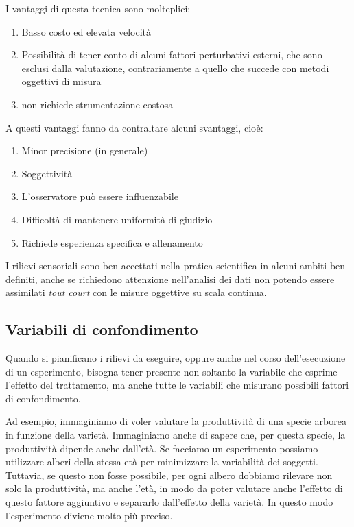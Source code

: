 \documentclass[
  12pt,
]{book}
\providecommand{\tightlist}{%
  \setlength{\itemsep}{0pt}\setlength{\parskip}{0pt}}
\begin{document}
I vantaggi di questa tecnica sono molteplici:

\begin{enumerate}
\def\labelenumi{\arabic{enumi}.}
\tightlist
\item
  Basso costo ed elevata velocità
\item
  Possibilità di tener conto di alcuni fattori perturbativi esterni, che sono esclusi dalla valutazione, contrariamente a quello che succede con metodi oggettivi di misura
\item
  non richiede strumentazione costosa
\end{enumerate}

A questi vantaggi fanno da contraltare alcuni svantaggi, cioè:

\begin{enumerate}
\def\labelenumi{\arabic{enumi}.}
\tightlist
\item
  Minor precisione (in generale)
\item
  Soggettività
\item
  L'osservatore può essere influenzabile
\item
  Difficoltà di mantenere uniformità di giudizio
\item
  Richiede esperienza specifica e allenamento
\end{enumerate}

I rilievi sensoriali sono ben accettati nella pratica scientifica in alcuni ambiti ben definiti, anche se richiedono attenzione nell'analisi dei dati non potendo essere assimilati \emph{tout court} con le misure oggettive su scala continua.

\hypertarget{variabili-di-confondimento}{%
\subsection{Variabili di confondimento}\label{variabili-di-confondimento}}

Quando si pianificano i rilievi da eseguire, oppure anche nel corso dell'esecuzione di un esperimento, bisogna tener presente non soltanto la variabile che esprime l'effetto del trattamento, ma anche tutte le variabili che misurano possibili fattori di confondimento.

Ad esempio, immaginiamo di voler valutare la produttività di una specie arborea in funzione della varietà. Immaginiamo anche di sapere che, per questa specie, la produttività dipende anche dall'età. Se facciamo un esperimento possiamo utilizzare alberi della stessa età per minimizzare la variabilità dei soggetti. Tuttavia, se questo non fosse possibile, per ogni albero dobbiamo rilevare non solo la produttività, ma anche l'età, in modo da poter valutare anche l'effetto di questo fattore aggiuntivo e separarlo dall'effetto della varietà. In questo modo l'esperimento diviene molto più preciso.
\end{document}
